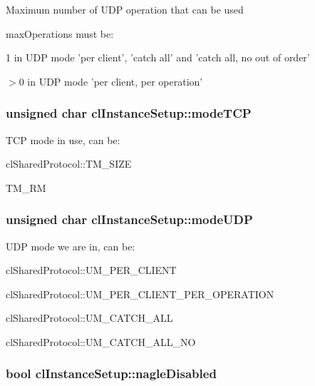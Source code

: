 \label{classcl_instance_setup_aab4429f5f5e4dbb03e0ac7b57a367cbb}
Maximum number of UDP operation that can be used \par
 {\ttfamily maxOperations} must be:
\begin{DoxyItemize}
\item 1 in UDP mode 'per client', 'catch all' and 'catch all, no out of order'
\item $>$0 in UDP mode 'per client, per operation' 
\end{DoxyItemize}\hypertarget{classcl_instance_setup_a7ad7f0ee077f5efdeb6140dfd30d8dbb}{
\subsubsection[{modeTCP}]{\setlength{\rightskip}{0pt plus 5cm}unsigned char {\bf clInstanceSetup::modeTCP}}}
\label{classcl_instance_setup_a7ad7f0ee077f5efdeb6140dfd30d8dbb}
TCP mode in use, can be:
\begin{DoxyItemize}
\item {\ttfamily clSharedProtocol::TM\_\-SIZE} 
\item {\ttfamily TM\_\-RM} 
\end{DoxyItemize}\hypertarget{classcl_instance_setup_aa367a51b021c0750ff667177d5a961ca}{
\subsubsection[{modeUDP}]{\setlength{\rightskip}{0pt plus 5cm}unsigned char {\bf clInstanceSetup::modeUDP}}}
\label{classcl_instance_setup_aa367a51b021c0750ff667177d5a961ca}
UDP mode we are in, can be:
\begin{DoxyItemize}
\item {\ttfamily clSharedProtocol::UM\_\-PER\_\-CLIENT} 
\item {\ttfamily clSharedProtocol::UM\_\-PER\_\-CLIENT\_\-PER\_\-OPERATION} 
\item {\ttfamily clSharedProtocol::UM\_\-CATCH\_\-ALL} 
\item {\ttfamily clSharedProtocol::UM\_\-CATCH\_\-ALL\_\-NO} 
\end{DoxyItemize}\hypertarget{classcl_instance_setup_a0326fa43d0d08783d371c7aab79f6d75}{
\subsubsection[{nagleDisabled}]{\setlength{\rightskip}{0pt plus 5cm}bool {\bf clInstanceSetup::nagleDisabled}}}

